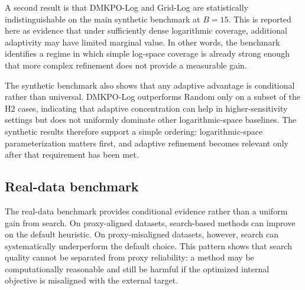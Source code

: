 \documentclass[10pt,lineno]{wlpeerj}
\begin{document}
A second result is that DMKPO-Log and Grid-Log are statistically indistinguishable on the main synthetic benchmark at $B=15$. This is reported here as evidence that under sufficiently dense logarithmic coverage, additional adaptivity may have limited marginal value. In other words, the benchmark identifies a regime in which simple log-space coverage is already strong enough that more complex refinement does not provide a measurable gain.

The synthetic benchmark also shows that any adaptive advantage is conditional rather than universal. DMKPO-Log outperforms Random only on a subset of the H2 cases, indicating that adaptive concentration can help in higher-sensitivity settings but does not uniformly dominate other logarithmic-space baselines. The synthetic results therefore support a simple ordering: logarithmic-space parameterization matters first, and adaptive refinement becomes relevant only after that requirement has been met.

\subsection*{Real-data benchmark}

The real-data benchmark provides conditional evidence rather than a uniform gain from search. On proxy-aligned datasets, search-based methods can improve on the default heuristic. On proxy-misaligned datasets, however, search can systematically underperform the default choice. This pattern shows that search quality cannot be separated from proxy reliability: a method may be computationally reasonable and still be harmful if the optimized internal objective is misaligned with the external target.
\end{document}
